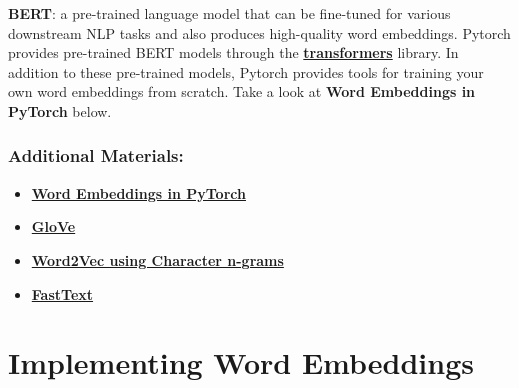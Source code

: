 \textbf{BERT}: a pre-trained language model that can be fine-tuned for various downstream NLP tasks and also produces high-quality word embeddings. Pytorch provides pre-trained BERT models through the \href{https://pytorch.org/hub/huggingface_pytorch-transformers/}{\textbf{transformers}} library.
In addition to these pre-trained models, Pytorch provides tools for training your own word embeddings from scratch. Take a look at \textbf{Word Embeddings in PyTorch} below.

\subsubsection{Additional Materials:}

\begin{itemize}
    \item \href{https://pytorch.org/tutorials/beginner/nlp/word_embeddings_tutorial.html\#word-embeddings-in-pytorch}{\textbf{Word Embeddings in PyTorch}}
    \item \href{https://nlp.stanford.edu/projects/glove/}{\textbf{GloVe}}
    \item \href{https://web.stanford.edu/class/archive/cs/cs224n/cs224n.1174/reports/2761021.pdf}{\textbf{Word2Vec using Character n-grams}}
    \item \href{https://fasttext.cc/docs/en/crawl-vectors.html}{\textbf{FastText}}
\end{itemize}

\section{Implementing Word Embeddings}

